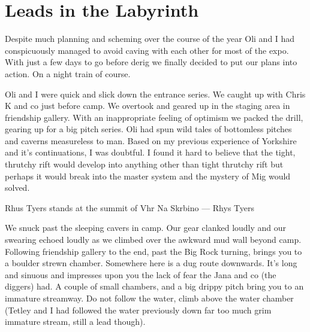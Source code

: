 \begin{marginfigure}
\end{marginfigure}

\section{Leads in the Labyrinth}
 
Despite much planning and scheming over the course of the year Oli and I had conspicuously managed to avoid caving with each other for most of the expo. With just a few days to go before derig we finally decided to put our plans into action. On a night train of course.
 
Oli and I were quick and slick down the entrance series. We caught up with Chris K and co just before camp. We overtook and geared up in the staging area in friendship gallery. With an inappropriate feeling of optimism we packed the drill, gearing up for a big pitch series. Oli had spun wild tales of bottomless pitches and caverns measureless to man. Based on my previous experience of Yorkshire and it’s continuations, I was doubtful. I found it hard to believe that the tight, thrutchy rift would develop into anything other than tight thrutchy rift but perhaps it would break into the master system and the mystery of Mig would solved. 


 \begin{marginfigure}
\centering
{}
\label{Monatip-rigging}
\caption{Rhus Tyers stands at the summit of Vhr Na Skrbino --- Rhys Tyers}
\end{marginfigure}

 
We snuck past the sleeping cavers in camp. Our gear clanked loudly and our swearing echoed loudly as we climbed over the awkward mud wall beyond camp. Following friendship gallery to the end, past the Big Rock turning, brings you to a boulder strewn chamber. Somewhere here is a dug route downwards. It’s long and sinuous and impresses upon you the lack of fear the Jana and co (the diggers) had. A couple of small chambers, and a big drippy pitch bring you to an immature streamway. Do not follow the water, climb above the water chamber (Tetley and I had followed the water previously down far too much grim immature stream, still a lead though). 
 
